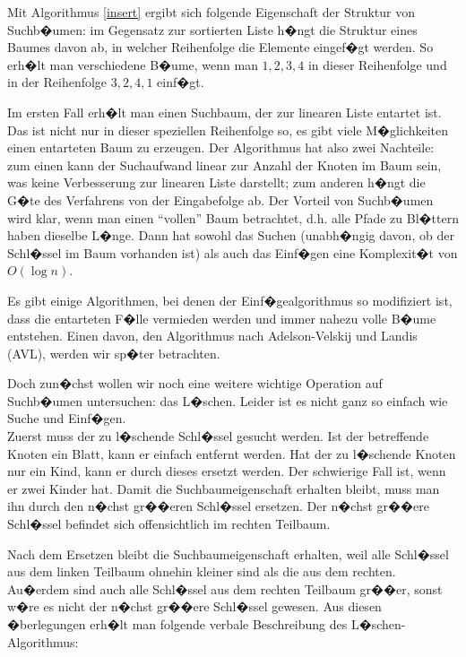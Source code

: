 Mit Algorithmus \ref{insert} ergibt sich folgende Eigenschaft der Struktur von Suchb�umen: im Gegensatz zur sortierten Liste h�ngt die Struktur eines Baumes davon ab, in welcher Reihenfolge die Elemente eingef�gt werden. So erh�lt man verschiedene B�ume, wenn man $1, 2, 3, 4$ in dieser Reihenfolge und in der Reihenfolge $3, 2, 4, 1$ einf�gt.


Im ersten Fall erh�lt man einen Suchbaum, der zur linearen Liste entartet ist. Das ist nicht nur in dieser speziellen Reihenfolge so, es gibt viele M�glichkeiten einen entarteten Baum zu erzeugen. Der Algorithmus hat also zwei Nachteile: zum einen kann der Suchaufwand linear zur Anzahl der Knoten im Baum sein, was keine Verbesserung zur linearen Liste darstellt; zum anderen h�ngt die G�te des Verfahrens von der Eingabefolge ab. Der Vorteil von Suchb�umen wird klar, wenn man einen "`vollen"' Baum betrachtet, d.h. alle Pfade zu Bl�ttern haben dieselbe L�nge. Dann hat sowohl das Suchen (unabh�ngig davon, ob der Schl�ssel im Baum vorhanden ist) als auch das Einf�gen eine Komplexit�t von $O(\log{n})$.

\medskip
Es gibt einige Algorithmen, bei denen der Einf�gealgorithmus so modifiziert ist, dass die entarteten F�lle vermieden werden und immer nahezu volle B�ume entstehen. Einen davon, den Algorithmus nach Adelson-Velskij und Landis (AVL), werden wir sp�ter betrachten.

Doch zun�chst wollen wir noch eine weitere wichtige Operation auf Suchb�umen untersuchen: das L�schen. Leider ist es nicht ganz so einfach wie Suche und Einf�gen.\\
Zuerst muss der zu l�schende Schl�ssel gesucht werden. Ist der betreffende Knoten ein Blatt, kann er einfach entfernt werden. Hat der zu l�schende Knoten nur ein Kind, kann er durch dieses ersetzt werden. Der schwierige Fall ist, wenn er zwei Kinder hat. Damit die Suchbaumeigenschaft erhalten bleibt, muss man ihn durch den n�chst gr��eren Schl�ssel ersetzen. Der n�chst gr��ere Schl�ssel befindet sich offensichtlich im rechten Teilbaum.

\medskip
Nach dem Ersetzen bleibt die Suchbaumeigenschaft erhalten, weil alle Schl�ssel aus dem linken Teilbaum ohnehin kleiner sind als die aus dem rechten. Au�erdem sind auch alle Schl�ssel aus dem rechten Teilbaum gr��er, sonst w�re es nicht der n�chst gr��ere Schl�ssel gewesen. Aus diesen �berlegungen erh�lt man folgende verbale Beschreibung des L�schen-Algorithmus:

